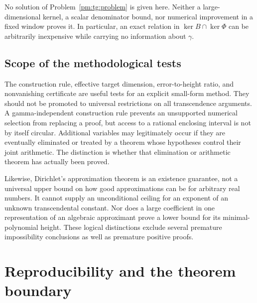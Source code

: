 \documentclass[11pt,a4paper]{article}
\theoremstyle{definition}
\theoremstyle{remark}
\numberwithin{equation}{section}
\begin{document}
No solution of Problem~\ref{pm:tg:problem} is given here.  Neither a
large-dimensional kernel, a scalar denominator bound, nor numerical
improvement in a fixed window proves it.  In particular, an exact relation
in $\ker B\cap\ker\Phi$ can be arbitrarily inexpensive while carrying
no information about $\gamma$.

\subsection{Scope of the methodological tests}

The construction rule, effective target dimension, error-to-height ratio,
and nonvanishing certificate are useful tests for an explicit small-form
method.  They should not be promoted to universal restrictions on all
transcendence arguments.  A gamma-independent construction rule prevents
an unsupported numerical selection from replacing a proof, but access to
a rational enclosing interval is not by itself circular.  Additional
variables may legitimately occur if they are eventually eliminated or
treated by a theorem whose hypotheses control their joint arithmetic.
The distinction is whether that elimination or arithmetic theorem has
actually been proved.

Likewise, Dirichlet's approximation theorem is an existence guarantee,
not a universal upper bound on how good approximations can be for arbitrary
real numbers.  It cannot supply an unconditional ceiling for an exponent
of an unknown transcendental constant.  Nor does a large coefficient in
one representation of an algebraic approximant prove a lower bound for
its minimal-polynomial height.  These logical distinctions exclude several
premature impossibility conclusions as well as premature positive proofs.

\section{Reproducibility and the theorem boundary}\label{pm:sec:reproduction}
\end{document}
